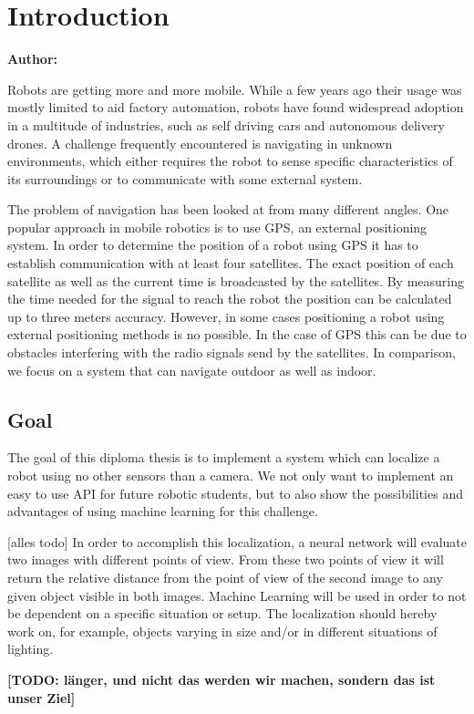\chapter{Introduction}

\textbf{Author:}

\vspace{2mm}

Robots are getting more and more mobile. While a few years ago their usage was mostly limited to aid factory automation, robots have found widespread adoption in a multitude of industries, such as self driving cars and autonomous delivery drones.
A challenge frequently encountered is navigating in unknown environments, which either requires the robot to sense specific characteristics of its surroundings or to communicate with some external system.

The problem of navigation has been looked at from many different angles. One popular approach in mobile robotics is to use GPS, an external positioning system. In order to determine the position of a robot using GPS it has to establish communication with at least four satellites. The exact position of each satellite as well as the current time is broadcasted by the satellites. By measuring the time needed for the signal to reach the robot the position can be calculated up to three meters accuracy.
However, in some cases positioning a robot using external positioning methods is no possible. In the case of GPS this can be due to obstacles interfering with the radio signals send by the satellites.
In comparison, we focus on a system that can navigate outdoor as well as indoor. 

\section{Goal}
The goal of this diploma thesis is to implement a system which can localize a robot using no other sensors than a camera. We not only want to implement an easy to use API for future robotic students, but to also show the possibilities and advantages of using machine learning for this challenge.

[alles todo]
In order to accomplish this localization, a neural network will evaluate two images with different points of view. From these two points of view it will return the relative distance from the point of view of the second image to any given object visible in both images. Machine Learning will be used in order to not be dependent on a specific situation or setup. The localization should hereby work on, for example, objects varying in size and/or in different situations of lighting.

\textbf{[TODO: länger, und nicht das werden wir machen, sondern das ist unser Ziel]}

\lipsum[1-5]

\filbreak
